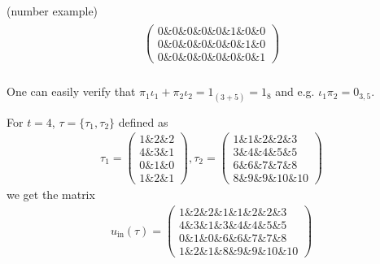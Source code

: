 \begin{example}{(number example)}
\begin{align*}
\begin{array}{rr}
\begin{pmatrix}
0 \ampersand 0 \ampersand 0 \ampersand 0 \ampersand 0 \ampersand 1 \ampersand 0 \ampersand 0 \\
0 \ampersand 0 \ampersand 0 \ampersand 0 \ampersand 0 \ampersand 0 \ampersand 1 \ampersand 0 \\
0 \ampersand 0 \ampersand 0 \ampersand 0 \ampersand 0 \ampersand 0 \ampersand 0 \ampersand 1
\end{pmatrix}
\end{array}
\end{align*}\\
\noindent One can easily verify that $\pi_{1} \iota_{1} + \pi_{2} \iota_{2} = 1_{(3+5)} = 1_{8}$ and e.g. $\iota_{1} \pi_{2} = 0_{3,5}$.\\

\noindent \begin{minipage}[t]{.5\textwidth}
For $t = 4$, $\tau = \{\tau_{1}, \tau_{2}\}$ defined as
\begin{align*}
\tau_{1} = \begin{pmatrix}
1 \ampersand 2 \ampersand 2 \\
4 \ampersand 3 \ampersand 1 \\
0 \ampersand 1 \ampersand 0 \\
1 \ampersand 2 \ampersand 1
\end{pmatrix},
\tau_{2} = \begin{pmatrix}
1 \ampersand 1 \ampersand 2 \ampersand 2 \ampersand 3 \\
3 \ampersand 4 \ampersand 4 \ampersand 5 \ampersand 5 \\
6 \ampersand 6 \ampersand 7 \ampersand 7 \ampersand 8 \\
8 \ampersand 9 \ampersand 9 \ampersand 10 \ampersand 10
\end{pmatrix}
\end{align*}
we get the matrix
\begin{align*}
u_{\text{in}}(\tau) = \begin{pmatrix}
1 \ampersand 2 \ampersand 2 \ampersand 1 \ampersand 1 \ampersand 2 \ampersand 2 \ampersand 3 \\
4 \ampersand 3 \ampersand 1 \ampersand 3 \ampersand 4 \ampersand 4 \ampersand 5 \ampersand 5 \\
0 \ampersand 1 \ampersand 0 \ampersand 6 \ampersand 6 \ampersand 7 \ampersand 7 \ampersand 8 \\
1 \ampersand 2 \ampersand 1 \ampersand 8 \ampersand 9 \ampersand 9 \ampersand 10 \ampersand 10
\end{pmatrix}
\end{align*}

\end{minipage}
\end{example}
